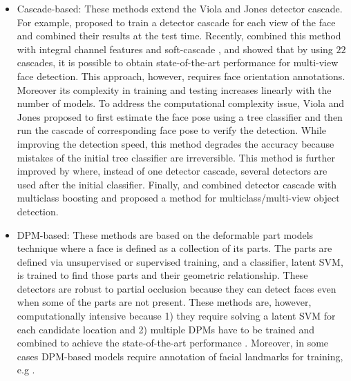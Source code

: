 \documentclass{sig-alternate-2013}
\begin{document}
\begin{itemize}
\item{Cascade-based: These methods extend the Viola and Jones detector cascade. For example, \cite{parallel_cascade} proposed to train a detector cascade for each view of the face and combined their results at the test time. Recently, \cite{head_hunter} combined this method with integral channel features \cite{integral_channel} and soft-cascade \cite{soft_cascade}, and showed that by using $22$ cascades, it is possible to obtain state-of-the-art performance for multi-view face detection. This approach, however, requires face orientation annotations. Moreover its complexity in training and testing increases linearly with the number of models. To address the computational complexity issue, Viola and Jones \cite{VJ_multi_view} proposed to first estimate the face pose using a tree classifier and then run the cascade of corresponding face pose to verify the detection. While improving the detection speed, this method degrades the accuracy because mistakes of the initial tree classifier are irreversible. This method is further improved by \cite{rotation_invariant, vector_boost} where, instead of one detector cascade, several detectors are used after the initial classifier. Finally, \cite{torralba_cascade} and \cite{multires_cascade} combined detector cascade with multiclass boosting and proposed a method for multiclass/multi-view object detection.} 
\item{DPM-based: These methods are based on the deformable part models technique \cite{dpm} where a face is defined as a collection of its parts. The parts are defined via unsupervised or supervised training, and a classifier, latent SVM, is trained to find those parts and their geometric relationship. These detectors are robust to partial occlusion because they
can detect faces even when some of the parts are not present. These methods are, however, computationally intensive because 1) they require solving a latent SVM for each candidate location and 2) multiple DPMs have to be trained and combined to achieve the state-of-the-art performance  \cite{head_hunter, tsm}. Moreover, in some cases DPM-based models require annotation of facial landmarks for training, e.g \cite{tsm}.} 

\end{itemize}
\end{document}
